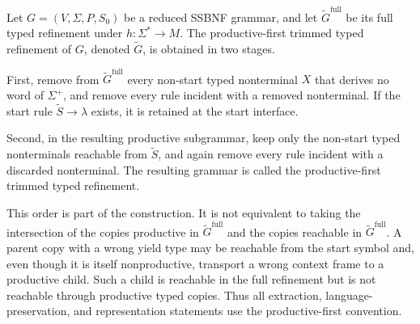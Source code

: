 \documentclass[sub]{jalc}
\newcommand{\Gfull}{\widetilde G^{\mathrm{full}}}
\newcommand{\Gtrim}{\widetilde G}
\begin{document}
\begin{definition}
\label{def:productive-first-trimming}
Let \(G=(V,\Sigma,P,S_0)\) be a reduced SSBNF grammar, and let \(\Gfull\) be its full typed refinement under \(h:\Sigma^*\to M\). The productive-first trimmed typed refinement of \(G\), denoted \(\Gtrim\), is obtained in two stages.

First, remove from \(\Gfull\) every non-start typed nonterminal \(X\) that derives no word of \(\Sigma^+\), and remove every rule incident with a removed nonterminal. If the start rule \(\widetilde S\to\lambda\) exists, it is retained at the start interface.

Second, in the resulting productive subgrammar, keep only the non-start typed nonterminals reachable from \(\widetilde S\), and again remove every rule incident with a discarded nonterminal. The resulting grammar is called the productive-first trimmed typed refinement.
\end{definition}

This order is part of the construction. It is not equivalent to taking the intersection of the copies productive in \(\Gfull\) and the copies reachable in \(\Gfull\). A parent copy with a wrong yield type may be reachable from the start symbol and, even though it is itself nonproductive, transport a wrong context frame to a productive child. Such a child is reachable in the full refinement but is not reachable through productive typed copies. Thus all extraction, language-preservation, and representation statements use the productive-first convention.
\end{document}
